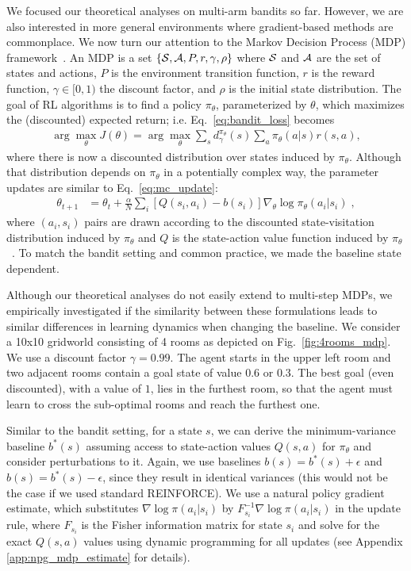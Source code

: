 We focused our theoretical analyses on multi-arm bandits so far. However, we are also interested in more general environments where gradient-based methods are commonplace. 
We now turn our attention to the Markov Decision Process (MDP) framework~\citep{puterman2014markov}. An MDP is a set $\{{\mathcal{S}}, {\mathcal{A}}, P, r, \gamma, \rho\}$ where ${\mathcal{S}}$ and ${\mathcal{A}}$ are the set of states and actions, $P$ is the environment transition function,
$r$ is the reward function, $\gamma \in [0, 1)$ the discount factor,
and $\rho$ is the initial state distribution. The goal of RL algorithms is to find a policy $\pi_\theta$, parameterized by $\theta$, which maximizes the (discounted) expected return; i.e. Eq.~\ref{eq:bandit_loss} becomes
\begin{align*}
    \arg\max_\theta J(\theta)
    = \arg\max_\theta \sum_s d^{\pi_\theta}_\gamma(s)\sum_{a} \pi_\theta(a | s) r(s, a), %
\end{align*}
where there is now a discounted distribution over states induced by $\pi_\theta$. Although that distribution depends on $\pi_\theta$ in a potentially complex way, the parameter updates are similar to Eq.~\ref{eq:mc_update}:
\begin{align*}
    \theta_{t+1} &= \theta_t + \frac{\alpha}{N} \sum_i [Q(s_i, a_i) - b(s_i)]\nabla_\theta \log \pi_\theta(a_i | s_i) \label{eq:mc_update_mdp} \; ,
\end{align*}
where $(a_i, s_i)$ pairs are drawn according to the discounted state-visitation distribution induced by $\pi_\theta$ and $Q$ is the state-action value function induced by $\pi_\theta$~\citep[c.f.][]{sutton18book}. To match the bandit setting and common practice, we made the baseline state dependent. 

Although our theoretical analyses do not easily extend to multi-step MDPs, we empirically investigated if the similarity between these formulations leads to similar differences in learning dynamics when changing the baseline. We consider a 10x10 gridworld consisting of 4 rooms as depicted on Fig.~\ref{fig:4rooms_mdp}. We use a discount factor $\gamma=0.99$. The agent starts in the upper left room and two adjacent rooms contain a goal state of value $0.6$ or $0.3$. The best  goal (even discounted), with a value of $1$, lies in the furthest room, so that the agent must learn to cross the sub-optimal rooms and reach the furthest one. 

Similar to the bandit setting, for a state $s$, we can derive the minimum-variance baseline $b^*(s)$ assuming access to state-action values $Q(s,a)$ for $\pi_\theta$ and consider perturbations to it. Again, we use baselines $b(s) = b^*(s) + \epsilon$ and $b(s) = b^*(s) - \epsilon$, since they result in identical variances (this would not be the case if we used standard REINFORCE). 
We use a natural policy gradient estimate, which substitutes $\nabla \log \pi (a_i|s_i)$ by $F^{-1}_{s_i} \nabla \log \pi(a_i|s_i)$ in the update rule, where $F_{s_i}$ is the Fisher information matrix for state $s_i$ and solve for the exact $Q(s,a)$ values using dynamic programming for all updates (see Appendix \ref{app:npg_mdp_estimate} for details). 


